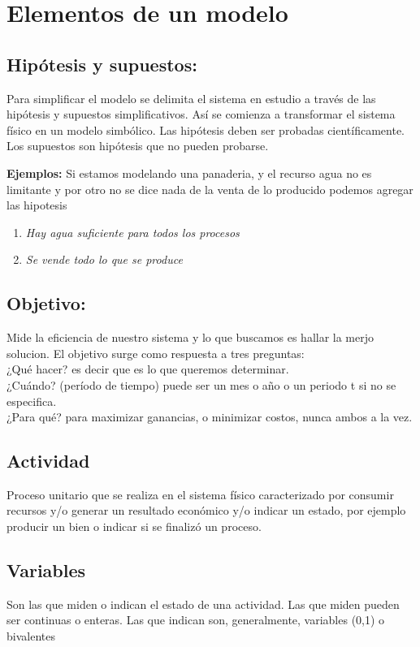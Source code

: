 \documentclass[12pt]{book}
\begin{document}
\section{Elementos de un modelo}
\subsection{Hipótesis y supuestos:} Para simplificar el modelo se delimita el sistema en estudio a través de las hipótesis y
supuestos simplificativos. Así se comienza a transformar el sistema físico en un modelo simbólico.
Las hipótesis deben ser probadas científicamente. Los supuestos son hipótesis que no pueden probarse.

\textbf{Ejemplos:}
Si estamos modelando una panaderia, y el recurso agua no es limitante y por otro no se dice nada de 				la venta de lo producido podemos agregar las hipotesis
\begin{enumerate}
	\item 	
	\textit{Hay agua suficiente para todos los procesos}
	\item
	\textit{Se vende todo lo que se produce}
\end{enumerate}
\subsection{Objetivo: }Mide la eficiencia de nuestro sistema y lo que buscamos es hallar la merjo solucion. El objetivo surge como respuesta a tres preguntas:
\\¿Qué hacer? es decir que es lo que queremos determinar.
\\¿Cuándo? (período de tiempo) puede ser un mes o año o un periodo t si no se especifica.
\\¿Para qué? para maximizar ganancias, o minimizar costos, nunca ambos a la vez.
\subsection{Actividad}
Proceso unitario que se realiza en el sistema físico caracterizado por consumir recursos
y/o generar un resultado económico y/o indicar un estado, por ejemplo producir un bien o indicar si se finaliz\'o un proceso.
\subsection{Variables}
Son las que miden o indican el estado de una actividad.
Las que miden pueden ser continuas o enteras.
Las que indican son, generalmente, variables (0,1) o bivalentes
\end{document}
